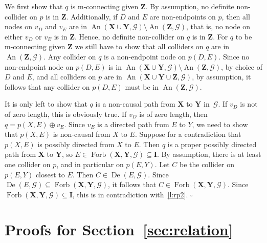 \documentclass[11pt,a4paper]{article}
\newenvironment{proofof}[1][]{\begin{trivlist}
   \item[\hskip \labelsep {\bfseries Proof of #1.}]}{\hfill{}$\square$\end{trivlist}}
\DeclareMathOperator{\De}{De}
\DeclareMathOperator{\An}{An}
\DeclareMathOperator{\Forbi}{Forb}
\newcommand{\g}[1][G]{\mathcal{#1}}
\newcommand{\fb}[2][X,Y]{\Forbi(\mathbf{#1},#2)}%
\begin{document}
\begin{proofof}[Lemma~\ref{lemma:rich prime}]
We first show that $q$ is m-connecting given $\mathbf{Z}$. By assumption, no definite non-collider on $p$ is in $\mathbf{Z}$. Additionally, if $D$ and $E$ are non-endpoints on $p$, then all nodes on $v_D$ and $v_E$ are in $\An(\mathbf{X} \cup \mathbf{Y}, \g) \setminus \An(\mathbf{Z},\g)$, that is, no node on either $v_D$ or $v_E$ is in $\mathbf{Z}$. Hence, no definite non-collider on $q$ is in $\mathbf{Z}$. For $q$ to be m-connecting given $\mathbf{Z}$ we still have to show that all colliders on $q$ are in $\An(\mathbf{Z},\g)$. Any collider on $q$ is a non-endpoint node on $p(D,E)$. Since no non-endpoint node on $p(D,E)$ is in $\An(\mathbf{X} \cup \mathbf{Y},\g) \setminus \An(\mathbf{Z},\g)$, by choice of $D$ and $E$, and all colliders on $p$ are in $\An(\mathbf{X} \cup \mathbf{Y} \cup \mathbf{Z}, \g)$, by assumption, it follows that any collider on $p(D,E)$ must be in $\An(\mathbf{Z},\g)$.

It is only left to show that $q$ is a non-causal path from $\mathbf{X}$ to $\mathbf{Y}$ in~$\g$.
If $v_{D}$ is not of zero length, this is obviously true.
If $v_D$ is of zero length, then $q = p(X,E) \oplus v_E$.  Since $v_E$ is a directed path from $E$ to $Y$, we need to show that $p(X,E)$ is non-causal from $X$ to $E$.  Suppose for a contradiction that $p(X,E)$ is possibly directed from $X$ to $E$. Then $q$ is a proper possibly directed path from $\mathbf{X}$ to $\mathbf{Y}$, so $E \in \fb{\g} \subseteq \mathbf{I}$. By assumption, there is at least one collider on $p$, and in particular on $p(E,Y)$. Let $C$ be the collider on $p(E,Y)$ closest to $E$. Then $C \in \De(E,\g)$. Since $\De(E,\g) \subseteq \fb{\g}$, it follows that $C \in \fb{\g}$. Since $\fb{\g} \subseteq \mathbf{I}$, this is in contradiction with~\ref{l:rp2}.
\end{proofof}

\section{Proofs for Section~\ref{sec:relation}} \label{subsec:proofs relation}
\end{document}
